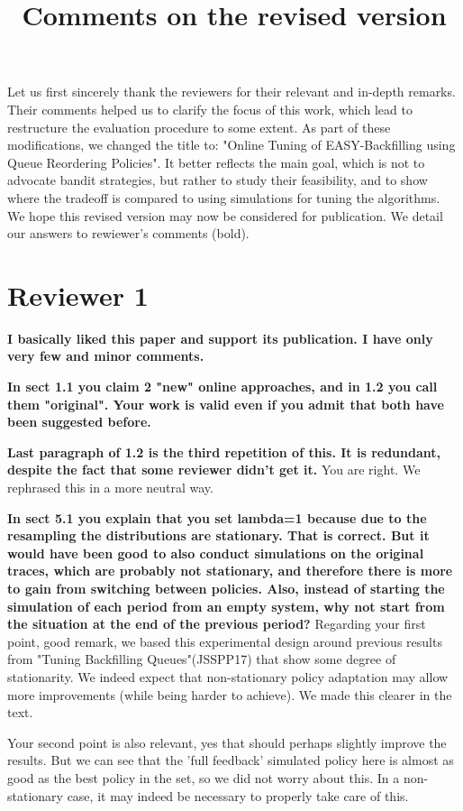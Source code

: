 \documentclass[]{article}
\title{Comments on the revised version}
\begin{document}
\maketitle

Let us first sincerely thank the reviewers for their relevant and in-depth
remarks. Their comments helped us to clarify the focus of this work, which
lead to restructure the evaluation procedure to some extent. As part of these
modifications, we changed the title to: "Online Tuning of EASY-Backfilling
using Queue Reordering Policies". It better reflects the main goal, which is
not to advocate bandit strategies, but rather to study their feasibility, and
to show where the tradeoff is compared to using simulations for tuning the
algorithms. We hope this revised version may now be considered for publication. 
We detail our answers to rewiewer's comments (bold).

\section{Reviewer 1}

\textbf{
  I basically liked this paper and support its publication.  I have only very few and minor comments.}

\textbf{In sect 1.1 you claim 2 "new" online approaches, and in 1.2 you call them "original". Your work is valid even if you
admit that both have been suggested before.
}

\textbf{Last paragraph of 1.2 is the third repetition of this.  It is redundant, despite the fact that some reviewer didn't get
it.
}
You are right. We rephrased this in a more neutral way.

\textbf{In sect 5.1 you explain that you set lambda=1 because due to the resampling the distributions are stationary.  That is
correct.  But it would have been good to also conduct simulations on the original traces, which are probably not
stationary, and therefore there is more to gain from switching between policies.
Also, instead of starting the simulation of each period from an empty system, why not start from the situation at the
end of the previous period?
}
Regarding your first point, good remark, we based this experimental design around previous results
from "Tuning Backfilling Queues"(JSSPP17) that show some degree of stationarity. We indeed
expect that non-stationary policy adaptation may allow more improvements (while
being harder to achieve). We made this clearer in the text.

Your second point is also relevant, yes that should perhaps slightly improve the results.
But we can see that the 'full feedback' simulated policy here is almost as good as the best
policy in the set, so we did not worry about this. In a non-stationary case, it may indeed
be necessary to properly take care of this.
\end{document}
